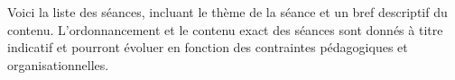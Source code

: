 \documentclass[french]{article}
\begin{document}
Voici la liste des séances, incluant le thème de la séance et un bref descriptif du contenu. L'ordonnancement et le contenu exact des séances sont donnés à titre indicatif et pourront évoluer en fonction des contraintes pédagogiques et organisationnelles.

\begin{center}

\tablelasttail{\hline}



\end{center}
\end{document}
